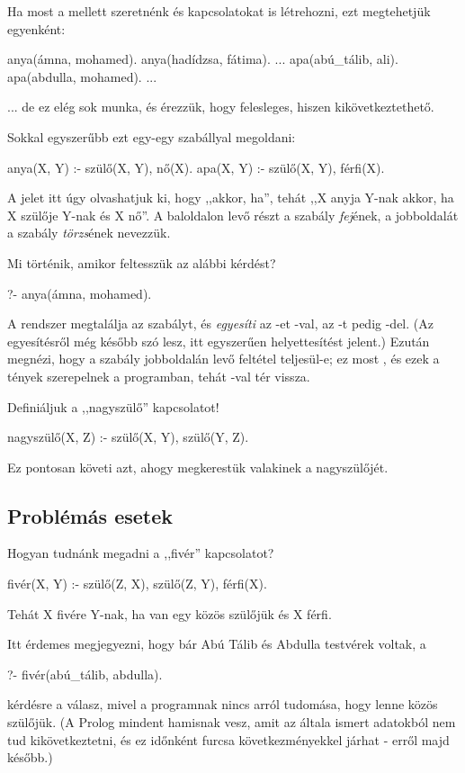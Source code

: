 Ha most a  mellett szeretnénk  és  kapcsolatokat is létrehozni, ezt megtehetjük egyenként:
\begin{prolog}
anya(ámna, mohamed).
anya(hadídzsa, fátima).
...
apa(abú_tálib, ali).
apa(abdulla, mohamed).
...
\end{prolog}
... de ez elég sok munka, és érezzük, hogy felesleges, hiszen kikövetkeztethető.

Sokkal egyszerűbb ezt egy-egy szabállyal megoldani:
\begin{prolog}
anya(X, Y) :- szülő(X, Y), nő(X).
apa(X, Y) :- szülő(X, Y), férfi(X).
\end{prolog}
A \pr{:-} jelet itt úgy olvashatjuk ki, hogy ,,akkor, ha'', tehát ,,X anyja Y-nak akkor, ha X szülője Y-nak és X nő''. A baloldalon levő részt a szabály \emph{fej}\/ének, a jobboldalát a szabály \emph{törzs}\/ének nevezzük.
  
Mi történik, amikor feltesszük az alábbi kérdést?
\begin{prolog}
?- anya(ámna, mohamed).
\end{prolog}
A rendszer megtalálja az  szabályt, és \emph{egyesíti} az -et -val, az -t pedig -del. (Az egyesítésről még később szó lesz, itt egyszerűen helyettesítést jelent.) Ezután megnézi, hogy a szabály jobboldalán levő feltétel teljesül-e; ez most , és ezek a tények szerepelnek a programban, tehát -val tér vissza.

Definiáljuk a ,,nagyszülő'' kapcsolatot!
\begin{prolog}
nagyszülő(X, Z) :- szülő(X, Y), szülő(Y, Z).
\end{prolog}
Ez pontosan követi azt, ahogy megkerestük valakinek a nagyszülőjét.

\subsection*{Problémás esetek}

Hogyan tudnánk megadni a ,,fivér'' kapcsolatot?
\begin{prolog}
fivér(X, Y) :- szülő(Z, X), szülő(Z, Y), férfi(X).
\end{prolog}
Tehát X fivére Y-nak, ha van egy közös szülőjük és X férfi.

Itt érdemes megjegyezni, hogy bár Abú Tálib és Abdulla testvérek voltak, a
\begin{prolog}
?- fivér(abú_tálib, abdulla).
\end{prolog}
kérdésre  a válasz, mivel a programnak nincs arról tudomása, hogy lenne közös szülőjük. (A Prolog mindent hamisnak vesz, amit az általa ismert adatokból nem tud kikövetkeztetni, és ez időnként furcsa következményekkel járhat - erről majd később.)

